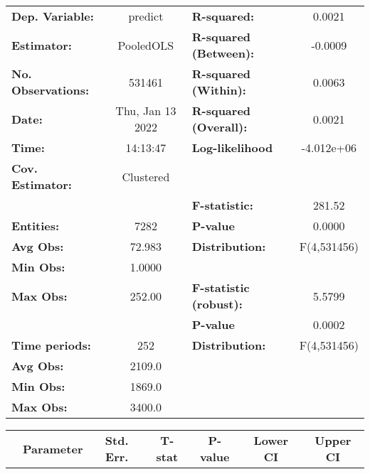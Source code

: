 \begin{center}
\begin{tabular}{lclc}
\toprule
\textbf{Dep. Variable:}    &      predict       & \textbf{  R-squared:         }   &      0.0021      \\
\textbf{Estimator:}        &     PooledOLS      & \textbf{  R-squared (Between):}  &     -0.0009      \\
\textbf{No. Observations:} &       531461       & \textbf{  R-squared (Within):}   &      0.0063      \\
\textbf{Date:}             &  Thu, Jan 13 2022  & \textbf{  R-squared (Overall):}  &      0.0021      \\
\textbf{Time:}             &      14:13:47      & \textbf{  Log-likelihood     }   &    -4.012e+06    \\
\textbf{Cov. Estimator:}   &     Clustered      & \textbf{                     }   &                  \\
\textbf{}                  &                    & \textbf{  F-statistic:       }   &      281.52      \\
\textbf{Entities:}         &        7282        & \textbf{  P-value            }   &      0.0000      \\
\textbf{Avg Obs:}          &       72.983       & \textbf{  Distribution:      }   &   F(4,531456)    \\
\textbf{Min Obs:}          &       1.0000       & \textbf{                     }   &                  \\
\textbf{Max Obs:}          &       252.00       & \textbf{  F-statistic (robust):} &      5.5799      \\
\textbf{}                  &                    & \textbf{  P-value            }   &      0.0002      \\
\textbf{Time periods:}     &        252         & \textbf{  Distribution:      }   &   F(4,531456)    \\
\textbf{Avg Obs:}          &       2109.0       & \textbf{                     }   &                  \\
\textbf{Min Obs:}          &       1869.0       & \textbf{                     }   &                  \\
\textbf{Max Obs:}          &       3400.0       & \textbf{                     }   &                  \\
\bottomrule
\end{tabular}
\begin{tabular}{lcccccc}
                & \textbf{Parameter} & \textbf{Std. Err.} & \textbf{T-stat} & \textbf{P-value} & \textbf{Lower CI} & \textbf{Upper CI}  \\

\end{tabular}
\end{center}
